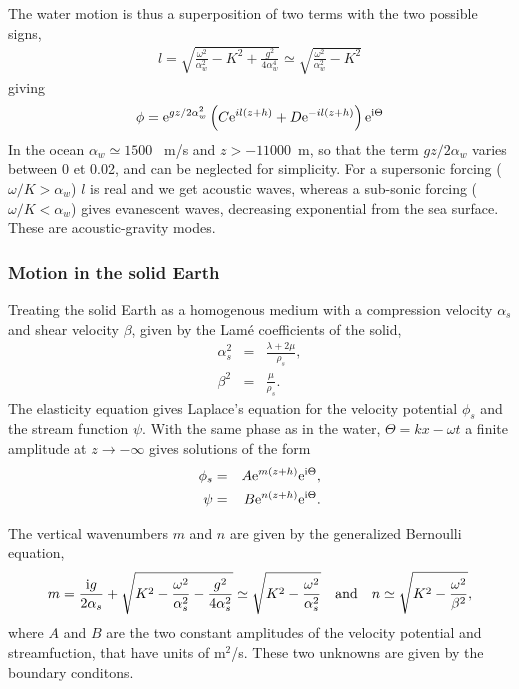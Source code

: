 The water motion is thus a superposition of two terms with the two possible signs, 
\begin{eqnarray}
 l= \sqrt{\frac{\omega^2}{\alpha_w^2} - K^2 + \frac{g^2}{4 \alpha_w^4}} \simeq \sqrt{\frac{\omega^2}{\alpha_w^2} - K^2}
\end{eqnarray}
giving
\begin{eqnarray}
 \phi = \mathrm{e}^{ g z/2\alpha_w^2 } \left ( C \mathrm{e}^{il(z+h)} + D \mathrm{e}^{-il(z+h)}\right) \mathrm{e}^{\mathrm{i} \Theta} 
\end{eqnarray}
In the ocean  $\alpha_w \simeq 1500$~ m/s and $z > -11000$~m,  so that the term  ${ g z/2\alpha_w }$ 
varies between  0 et 0.02, and can be neglected for simplicity. 
For a supersonic forcing  ($\omega/K > \alpha_w$)  $l$ is real and we get acoustic waves, 
whereas a sub-sonic forcing ($\omega/K < \alpha_w$) gives evanescent waves, decreasing exponential from the sea surface. These are 
acoustic-gravity modes. 

\subsubsection{Motion in the solid Earth}
Treating the solid Earth as a homogenous medium with a compression velocity $\alpha_s$ and shear velocity $\beta$, given 
by the Lam{\'e} coefficients of the solid, 
\begin{eqnarray}
  \alpha_s^2& =&\frac{\lambda+2 \mu}{\rho_s}, \\
  \beta^2& =&\frac{\mu}{\rho_s}.
\end{eqnarray}
The elasticity equation gives Laplace's equation for the 
velocity potential  $\phi_s$ and the stream function  $\psi$. With the same phase as in the water, $\Theta = k x-\omega t$ 
a finite amplitude at $z \rightarrow - \infty$ gives solutions of the form 
\begin{eqnarray}
  \phi_s &=&  A \mathrm{e}^{m(z+h)}\mathrm{e}^{\mathrm{i} \Theta}, \\
  \psi   &=& B  \mathrm{e}^{n(z+h)}\mathrm{e}^{\mathrm{i} \Theta}. 
\end{eqnarray}

The vertical wavenumbers $m$ and $n$ are given by the generalized Bernoulli equation, 
\begin{equation}
m = \frac{\mathrm{i} g}{2 \alpha_s}+\sqrt{K^2 - \frac{\omega^2}{\alpha_s^2} - \frac{g^2}{4 \alpha_s^2}}
       \simeq \sqrt{K^2 - \frac{\omega^2}{\alpha_s^2}}  \quad {\mathrm{and}} \quad  
n \simeq \sqrt{K^2 - \frac{\omega^2}{\beta^2}},
\end{equation}
where $A$ and $B$ are the two constant amplitudes of the velocity potential and streamfuction, 
that have units of  m$^2$/s. These two unknowns 
are given by the boundary conditons. 


